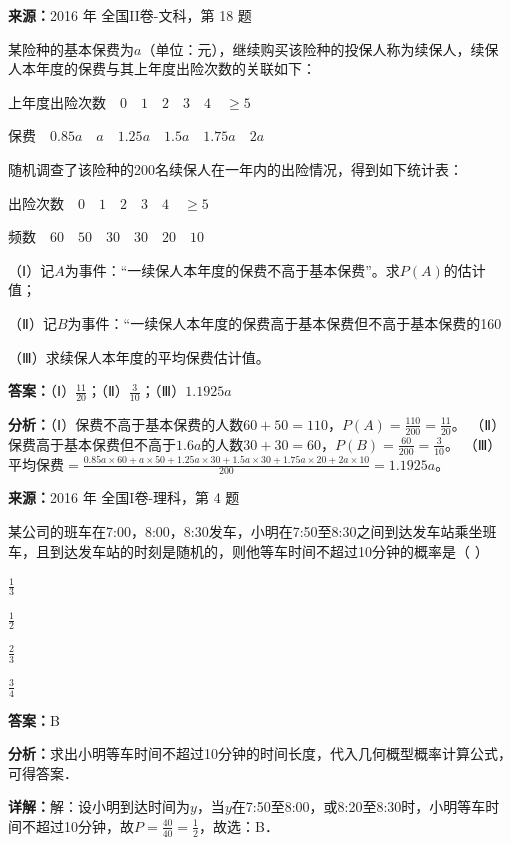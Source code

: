 \begin{question}[points=12]
\textbf{来源：}2016 年 全国II卷-文科，第 18 题\par
某险种的基本保费为$a$（单位：元），继续购买该险种的投保人称为续保人，续保人本年度的保费与其上年度出险次数的关联如下：



上年度出险次数$\quad0\quad1\quad2\quad3\quad4\quad\ge5$

保费$\quad0.85a\quad a\quad1.25a\quad1.5a\quad1.75a\quad2a$



随机调查了该险种的200名续保人在一年内的出险情况，得到如下统计表：



出险次数$\quad0\quad1\quad2\quad3\quad4\quad\ge5$

频数$\quad60\quad50\quad30\quad30\quad20\quad10$



（Ⅰ）记$A$为事件：“一续保人本年度的保费不高于基本保费”。求$P(A)$的估计值；

（Ⅱ）记$B$为事件：“一续保人本年度的保费高于基本保费但不高于基本保费的160%

（Ⅲ）求续保人本年度的平均保费估计值。
\begin{solution}
\textbf{答案：}（Ⅰ）$\frac{11}{20}$；（Ⅱ）$\frac{3}{10}$；（Ⅲ）$1.1925a$

\textbf{分析：}（Ⅰ）保费不高于基本保费的人数$60+50=110$，$P(A)=\frac{110}{200}=\frac{11}{20}$。
（Ⅱ）保费高于基本保费但不高于$1.6a$的人数$30+30=60$，$P(B)=\frac{60}{200}=\frac{3}{10}$。
（Ⅲ）平均保费$=\frac{0.85a\times60+a\times50+1.25a\times30+1.5a\times30+1.75a\times20+2a\times10}{200}=1.1925a$。
\end{solution}
\end{question}

\begin{question}[points=5]
\textbf{来源：}2016 年 全国I卷-理科，第 4 题\par
某公司的班车在7:00，8:00，8:30发车，小明在7:50至8:30之间到达发车站乘坐班车，且到达发车站的时刻是随机的，则他等车时间不超过10分钟的概率是（ ）
\begin{choices}
  \item $\frac{1}{3}$
  \item $\frac{1}{2}$
  \item $\frac{2}{3}$
  \item $\frac{3}{4}$
\end{choices}
\begin{solution}
\textbf{答案：}B

\textbf{分析：}求出小明等车时间不超过10分钟的时间长度，代入几何概型概率计算公式，可得答案．

\textbf{详解：}解：设小明到达时间为$y$，当$y$在7:50至8:00，或8:20至8:30时，小明等车时间不超过10分钟，故$P=\frac{40}{40}=\frac{1}{2}$，故选：B．
\end{solution}
\end{question}

